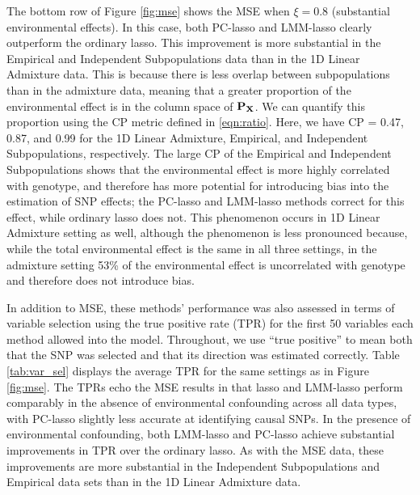The bottom row of Figure \ref{fig:mse} shows the MSE when $\xi = 0.8$ (substantial environmental effects). In this case, both PC-lasso and LMM-lasso clearly outperform the ordinary lasso. This improvement is more substantial in the Empirical and Independent Subpopulations data than in the 1D Linear Admixture data. This is because there is less overlap between subpopulations than in the admixture data, meaning that a greater proportion of the environmental effect is in the column space of $\mathbf{P}_{\mathbf{X}}$. We can quantify this proportion using the CP metric defined in \eqref{eqn:ratio}. Here, we have CP = 0.47, 0.87, and 0.99 for the 1D Linear Admixture, Empirical, and Independent Subpopulations, respectively. The large CP of the Empirical and Independent Subpopulations shows that the environmental effect is more highly correlated with genotype, and therefore has more potential for introducing bias into the estimation of SNP effects; the PC-lasso and LMM-lasso methods correct for this effect, while ordinary lasso does not.  This phenomenon occurs in 1D Linear Admixture setting as well, although the phenomenon is less pronounced because, while the total environmental effect is the same in all three settings, in the admixture setting 53\% of the environmental effect is uncorrelated with genotype and therefore does not introduce bias.

In addition to MSE, these methods' performance was also assessed in terms of variable selection using the true positive rate (TPR) for the first 50 variables each method allowed into the model. Throughout, we use ``true positive'' to mean both that the SNP was selected and that its direction was estimated correctly. Table \ref{tab:var_sel} displays the average TPR for the same settings as in Figure \ref{fig:mse}. The TPRs echo the MSE results in that lasso and LMM-lasso perform comparably in the absence of environmental confounding across all data types, with PC-lasso slightly less accurate at identifying causal SNPs. In the presence of environmental confounding, both LMM-lasso and PC-lasso achieve substantial improvements in TPR over the ordinary lasso. As with the MSE data, these improvements are more substantial in the Independent Subpopulations and Empirical data sets than in the 1D Linear Admixture data.

